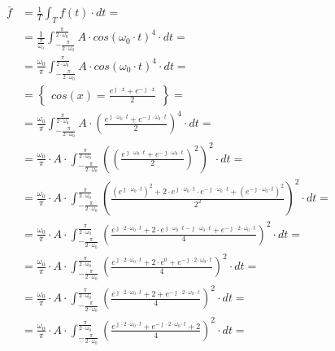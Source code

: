 \begin{task}
\begin{align*}
\bar{f} &=\frac{1}{T}\int_{T}^{} f(t) \cdot dt=\\
&=\frac{1}{\frac{\pi}{\omega_0}}\int_{-\frac{\pi}{2\cdot\omega_0}}^{\frac{\pi}{2\cdot\omega_0}} A \cdot cos\left(\omega_0 \cdot t\right)^4 \cdot dt=\\
&=\frac{\omega_0}{\pi}\int_{-\frac{\pi}{2\cdot\omega_0}}^{\frac{\pi}{2\cdot\omega_0}} A \cdot cos\left(\omega_0 \cdot t\right)^4 \cdot dt=\\
&=\begin{Bmatrix}cos(x)=\frac{e^{\jmath \cdot x}+e^{-\jmath \cdot x}}{2}\end{Bmatrix}=\\
&=\frac{\omega_0}{\pi}\int_{-\frac{\pi}{2\cdot\omega_0}}^{\frac{\pi}{2\cdot\omega_0}} A \cdot \left( \frac{e^{\jmath \cdot \omega_0 \cdot t}+e^{-\jmath \cdot \omega_0 \cdot t}}{2} \right)^4 \cdot dt=\\
&=\frac{\omega_0}{\pi} \cdot A \cdot \int_{-\frac{\pi}{2\cdot\omega_0}}^{\frac{\pi}{2\cdot\omega_0}} \left( \left( \frac{e^{\jmath \cdot \omega_0 \cdot t}+e^{-\jmath \cdot \omega_0 \cdot t}}{2} \right)^2\right)^2 \cdot dt=\\
&=\frac{\omega_0}{\pi} \cdot A \cdot \int_{-\frac{\pi}{2\cdot\omega_0}}^{\frac{\pi}{2\cdot\omega_0}} \left(  \frac{\left(e^{\jmath \cdot \omega_0 \cdot t}\right)^2+2\cdot e^{\jmath \cdot \omega_0 \cdot t} \cdot e^{-\jmath \cdot \omega_0 \cdot t} + \left(e^{-\jmath \cdot \omega_0 \cdot t}\right)^2}{2^2} \right)^2 \cdot dt=\\
&=\frac{\omega_0}{\pi} \cdot A \cdot \int_{-\frac{\pi}{2\cdot\omega_0}}^{\frac{\pi}{2\cdot\omega_0}} \left(  \frac{e^{\jmath \cdot 2 \cdot \omega_0 \cdot t}+2\cdot e^{\jmath \cdot \omega_0 \cdot t -\jmath \cdot \omega_0 \cdot t} + e^{-\jmath \cdot 2 \cdot \omega_0 \cdot t}}{4} \right)^2 \cdot dt=\\
&=\frac{\omega_0}{\pi} \cdot A \cdot \int_{-\frac{\pi}{2\cdot\omega_0}}^{\frac{\pi}{2\cdot\omega_0}} \left(  \frac{e^{\jmath \cdot 2 \cdot \omega_0 \cdot t}+2\cdot e^{0} + e^{-\jmath \cdot 2 \cdot \omega_0 \cdot t}}{4} \right)^2 \cdot dt=\\
&=\frac{\omega_0}{\pi} \cdot A \cdot \int_{-\frac{\pi}{2\cdot\omega_0}}^{\frac{\pi}{2\cdot\omega_0}} \left(  \frac{e^{\jmath \cdot 2 \cdot \omega_0 \cdot t}+2 + e^{-\jmath \cdot 2 \cdot \omega_0 \cdot t}}{4} \right)^2 \cdot dt=\\
&=\frac{\omega_0}{\pi} \cdot A \cdot \int_{-\frac{\pi}{2\cdot\omega_0}}^{\frac{\pi}{2\cdot\omega_0}} \left(  \frac{e^{\jmath \cdot 2 \cdot \omega_0 \cdot t}+e^{-\jmath \cdot 2 \cdot \omega_0 \cdot t}+2}{4} \right)^2 \cdot dt=\\

\end{align*}
\end{task}
